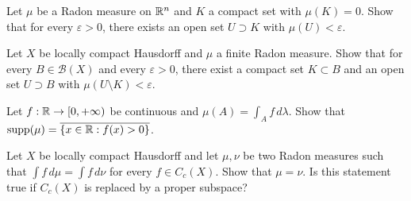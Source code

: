 \begin{exercise}
Let $\mu$ be a Radon measure on $\mathbb{R}^n$ and $K$ a compact set with $\mu(K) = 0$. Show
that for every $\varepsilon > 0$, there exists an open set $U \supset K$ with
$\mu(U) < \varepsilon$.
\end{exercise}

\begin{exercise}
Let $X$ be locally compact Hausdorff and $\mu$ a finite Radon measure. Show that for
every $B \in \mathcal{B}(X)$ and every $\varepsilon > 0$, there exist a compact set
$K \subset B$ and an open set $U \supset B$ with $\mu(U \setminus K) < \varepsilon$.
\end{exercise}

\begin{exercise}
Let $f : \mathbb{R} \to [0, +\infty)$ be continuous and $\mu(A) = \int_A f\, d\lambda$.
Show that $\mathrm{supp}(\mu) = \overline{\{x \in \mathbb{R} : f(x) > 0\}}$.
\end{exercise}

\begin{exercise}
Let $X$ be locally compact Hausdorff and let $\mu, \nu$ be two Radon measures such
that $\int f\, d\mu = \int f\, d\nu$ for every $f \in C_c(X)$. Show that $\mu = \nu$.
Is this statement true if $C_c(X)$ is replaced by a proper subspace?
\end{exercise}
